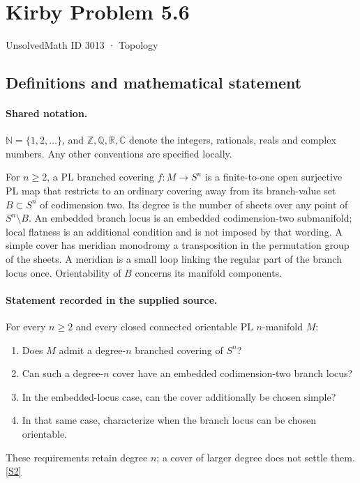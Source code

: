 \documentclass[11pt]{article}
\newcommand{\sref}[2]{\hyperlink{source:#1:#2}{[S#2]}}
\begin{document}
\setcounter{section}{3012}
\section{Kirby Problem 5.6}\label{3013}
{\small\sffamily UnsolvedMath ID 3013 · Topology}
\subsection{Definitions and mathematical statement}

\paragraph{Shared notation.}$\mathbb N=\{1,2,\ldots\}$, and $\mathbb Z,\mathbb Q,\mathbb R,\mathbb C$ denote the integers, rationals, reals and complex numbers. Any other conventions are specified locally.


For $n\geq2$, a PL branched covering $f:M\to S^n$ is a finite-to-one open surjective PL map that restricts to an ordinary covering away from its branch-value set $B\subset S^n$ of codimension two. Its degree is the number of sheets over any point of $S^n\setminus B$. An embedded branch locus is an embedded codimension-two submanifold; local flatness is an additional condition and is not imposed by that wording. A simple cover has meridian monodromy a transposition in the permutation group of the sheets. A meridian is a small loop linking the regular part of the branch locus once. Orientability of $B$ concerns its manifold components.
\paragraph{Statement recorded in the supplied source.}
For every $n\geq2$ and every closed connected orientable PL $n$-manifold $M$:
\begin{enumerate}
\item[(a)] Does $M$ admit a degree-$n$ branched covering of $S^n$?
\item[(b)] Can such a degree-$n$ cover have an embedded codimension-two branch locus?
\item[(c)] In the embedded-locus case, can the cover additionally be chosen simple?
\item[(d)] In that same case, characterize when the branch locus can be chosen orientable.
\end{enumerate}
These requirements retain degree $n$; a cover of larger degree does not settle them. \sref{3013}{2}
\end{document}
